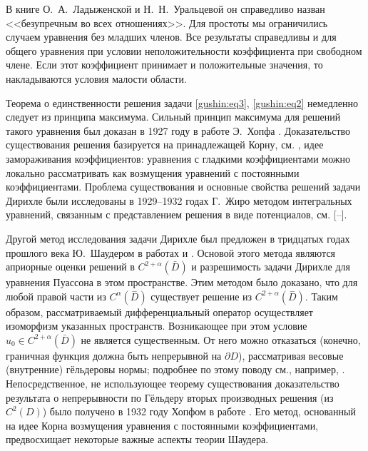 В книге О.~А.~Ладыженской и Н.~Н.~Уральцевой \cite{gushin:LUr} он справедливо назван <<безупречным во всех отношениях>>. Для простоты мы ограничились случаем уравнения без младших членов. Все результаты справедливы и для общего уравнения при условии неположительности коэффициента при свободном члене. Если этот коэффициент принимает и положительные значения, то накладываются условия малости области.



Теорема о единственности решения задачи \eqref{gushin:eq3}, \eqref{gushin:eq2} немедленно следует из принципа максимума. Сильный принцип максимума для решений такого уравнения был доказан в 1927 году в работе Э.~Хопфа \cite{gushin:Hopf1}. Доказательство существования решения базируется на принадлежащей Корну, см. \cite{gushin:Korn2}, идее замораживания коэффициентов: уравнения с гладкими коэффициентами можно локально рассматривать как возмущения уравнений с постоянными коэффициентами. Проблема существования и основные свойства решений задачи Дирихле были исследованы в 1929--1932 годах Г.~Жиро методом интегральных уравнений, связанным с представлением решения в виде потенциалов, см. [--].



Другой метод исследования задачи Дирихле был предложен в тридцатых годах прошлого века Ю.~Шаудером в работах \cite{gushin:Sch1} и \cite{gushin:Sch2}. Основой этого метода являются априорные оценки решений в $C^{2+\alpha}(\bar{D})$ и разрешимость задачи Дирихле для уравнения Пуассона в этом пространстве. Этим методом было доказано, что для любой правой части из $C^{\alpha}({\stackrel{-}{D}})$ существует решение из $C^{2+\alpha}({\stackrel{-}{D}})$. Таким образом, рассматриваемый дифференциальный оператор осуществляет изоморфизм указанных пространств. Возникающее при этом условие $u_0 \in C^{2+\alpha}({\bar{D}})$ не является существенным. От него можно отказаться (конечно, граничная функция должна быть непрерывной на $\partial D$), рассматривая весовые (внутренние) гёльдеровы нормы; подробнее по этому поводу см., например, \cite{gushin:GTr}. Непосредственное, не использующее теорему существования доказательство результата о непрерывности по Гёльдеру вторых производных решения (из $C^2(D)$) было получено в  1932 году Хопфом в работе \cite{gushin:Hopf2}. Его метод, основанный на идее Корна возмущения уравнения с постоянными коэффициентами, предвосхищает некоторые важные аспекты теории Шаудера.

